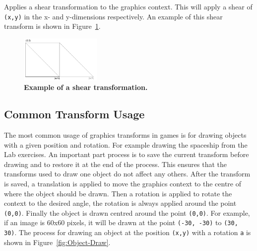 \documentclass[a4paper, 10pt]{report}
\begin{document}
Applies a shear transformation to the graphics context. This will apply a shear of {\tt (x,y)} in the x- and y-dimensions respectively. An example of this shear transform is shown in Figure~\ref{fig:Shear}.

\begin{figure}[h!]
\begin{center}
\includegraphics[width=0.35\textwidth]{shear}
\caption{{\bf Example of a shear transformation.}}
\label{fig:Shear}
\end{center}
\end{figure}

\hrulefill

\subsection*{Common Transform Usage} \nonumber

The most common usage of graphics transforms in games is for drawing objects with a given position and rotation. For example drawing the spaceship from the Lab exercises. An important part process is to save the current transform before drawing and to restore it at the end of the process. This ensures that the transforms used to draw one object do not affect any others. After the transform is saved, a translation is applied to move the graphics context to the centre of where the object should be drawn. Then a rotation is applied to rotate the context to the desired angle, the rotation is always applied around the point {\tt (0,0)}. Finally the object is drawn centred around the point {\tt (0,0)}. For example, if an image is 60x60 pixels, it will be drawn at the point {\tt (-30, -30)} to {\tt (30, 30)}. The process for drawing an object at the position {\tt (x,y)} with a rotation {\tt a} is shown in Figure~\ref{fig:Object-Draw}.
\end{document}
